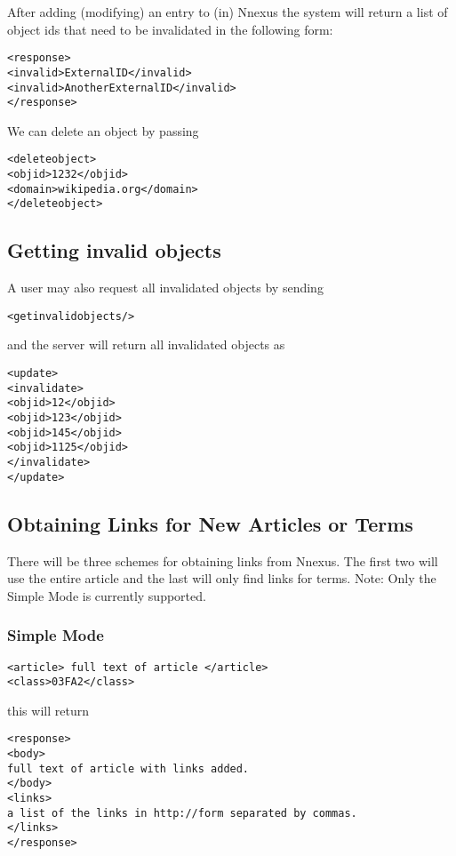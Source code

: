 \documentclass{article}
\begin{document}
After adding (modifying) an entry to (in) Nnexus the system will return a list of object ids that need to be
invalidated in the following form:
\begin{verbatim}
<response>
<invalid>ExternalID</invalid>
<invalid>AnotherExternalID</invalid>
</response>
\end{verbatim}

We can delete an object by passing
\begin{verbatim}
<deleteobject>
<objid>1232</objid>
<domain>wikipedia.org</domain>
</deleteobject>
\end{verbatim}

\subsection{Getting invalid objects}
A user may also request all invalidated objects by sending
\begin{verbatim}
<getinvalidobjects/>
\end{verbatim}
and the server will return all invalidated objects as
\begin{verbatim}
<update>
<invalidate>
<objid>12</objid>
<objid>123</objid>
<objid>145</objid>
<objid>1125</objid>
</invalidate>
</update>
\end{verbatim}

\subsection{Obtaining Links for New Articles or Terms}
There will be three schemes for obtaining links from Nnexus. The first two will use the entire article
and the last will only find links for terms. Note: Only the Simple Mode is currently supported.

\subsubsection{Simple Mode}
\begin{verbatim}
<article> full text of article </article>
<class>03FA2</class>
\end{verbatim}
this will return
\begin{verbatim}
<response>
<body>
full text of article with links added.
</body>
<links>
a list of the links in http://form separated by commas.
</links>
</response>
\end{verbatim}
\end{document}
